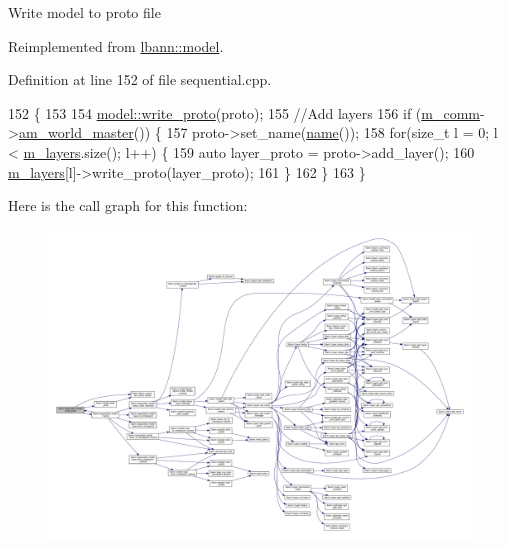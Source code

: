 Write model to proto file 

Reimplemented from \hyperlink{classlbann_1_1model_a488da86420421a4890c8fd7a95849acc}{lbann\+::model}.



Definition at line 152 of file sequential.\+cpp.


\begin{DoxyCode}
152                                                          \{
153 
154   \hyperlink{classlbann_1_1model_a488da86420421a4890c8fd7a95849acc}{model::write\_proto}(proto);
155   \textcolor{comment}{//Add layers}
156   \textcolor{keywordflow}{if} (\hyperlink{classlbann_1_1model_a0eabaf2b2f829fd5db3dfd26df420df0}{m\_comm}->\hyperlink{classlbann_1_1lbann__comm_a1ef526486183a29feadca9bef096a534}{am\_world\_master}()) \{
157     proto->set\_name(\hyperlink{classlbann_1_1sequential__model_abf2b69dacb5ee3165289377e1d961cd5}{name}());
158     \textcolor{keywordflow}{for}(\textcolor{keywordtype}{size\_t} l = 0; l < \hyperlink{classlbann_1_1model_a0229fc226ec163d1411548446104569d}{m\_layers}.size(); l++) \{
159       \textcolor{keyword}{auto} layer\_proto = proto->add\_layer();
160       \hyperlink{classlbann_1_1model_a0229fc226ec163d1411548446104569d}{m\_layers}[l]->write\_proto(layer\_proto);
161     \}
162   \}
163 \}
\end{DoxyCode}
Here is the call graph for this function\+:\nopagebreak
\begin{figure}[H]
\begin{center}
\leavevmode
\includegraphics[width=350pt]{classlbann_1_1sequential__model_a53a83327a1115a53affa78c93344e641_cgraph}
\end{center}
\end{figure}
